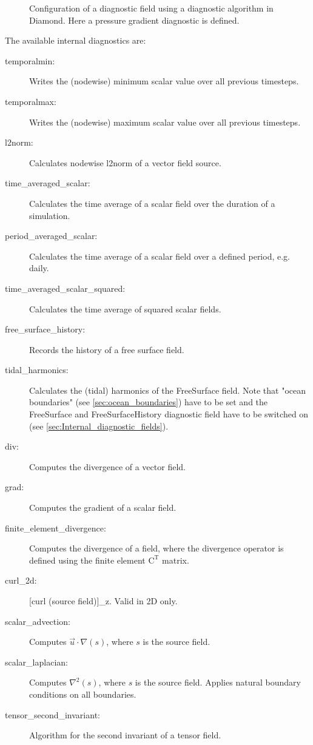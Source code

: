 \begin{figure}[ht]
  \centering
  \caption{Configuration of a diagnostic field using a diagnostic algorithm in
           Diamond. Here a pressure gradient diagnostic is defined.}
  \label{fig:diagnostic_algorithm}
\end{figure}

The available internal diagnostics are:
\begin{description}
\item[temporalmin:]Writes the (nodewise) minimum scalar value over all previous timesteps.
\item[temporalmax:]Writes the (nodewise) maximum scalar value over all previous timesteps.
\item[l2norm:]Calculates nodewise l2norm of a vector field source.
\item[time\_averaged\_scalar:]Calculates the time average of a scalar field over the duration of a simulation.
\item[period\_averaged\_scalar:]Calculates the time average of a scalar field over a defined period, e.g. daily.
\item[time\_averaged\_scalar\_squared:]Calculates the time average of squared scalar fields.
\item[free\_surface\_history:]Records the history of a free surface field.
\item[tidal\_harmonics:]Calculates the (tidal) harmonics of the FreeSurface field. Note that "ocean boundaries" (see \ref{sec:ocean_boundaries}) have to be set and the FreeSurface and FreeSurfaceHistory diagnostic field have to be switched on (see \ref{sec:Internal_diagnostic_fields}).  
\item[div:]Computes the divergence of a vector field.
\item[grad:]Computes the gradient of a scalar field.
\item[finite\_element\_divergence:]Computes the divergence of a field, where the divergence operator is defined using the finite element $\mathrm{C}^\mathrm{T}$ matrix.
\item[curl\_2d:][curl (source field)]\_z. Valid in 2D only.
\item[scalar\_advection:]Computes $\vec{u}\cdot\nabla(s)$, where $s$ is the source field.
\item[scalar\_laplacian:]Computes $\nabla^2(s)$, where $s$ is the source field. Applies natural boundary conditions on all boundaries.
\item[tensor\_second\_invariant:]Algorithm for the second invariant of a tensor field.

\end{description}
